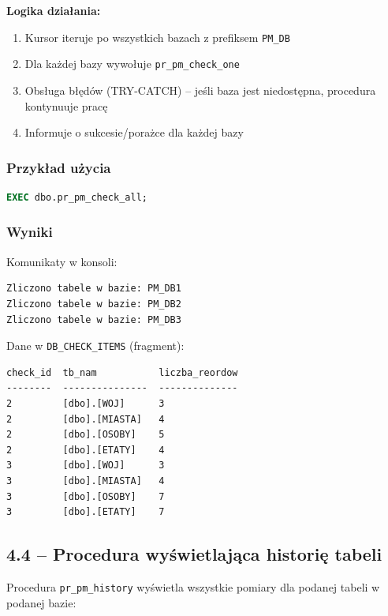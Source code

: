 \documentclass[a4paper,11pt]{article}
\begin{document}
	\textbf{Logika działania:}
	\begin{enumerate}
		\item Kursor iteruje po wszystkich bazach z prefiksem \texttt{PM\_DB}
		\item Dla każdej bazy wywołuje \texttt{pr\_pm\_check\_one}
		\item Obsługa błędów (TRY-CATCH) -- jeśli baza jest niedostępna, procedura kontynuuje pracę
		\item Informuje o sukcesie/porażce dla każdej bazy
	\end{enumerate}
	
	\subsubsection{Przykład użycia}
	
	\begin{lstlisting}[language=SQL]
EXEC dbo.pr_pm_check_all;
	\end{lstlisting}
	
	\subsubsection{Wyniki}
	
	Komunikaty w konsoli:
	\begin{lstlisting}
Zliczono tabele w bazie: PM_DB1
Zliczono tabele w bazie: PM_DB2
Zliczono tabele w bazie: PM_DB3
	\end{lstlisting}
	
	Dane w \texttt{DB\_CHECK\_ITEMS} (fragment):
	\begin{lstlisting}
check_id  tb_nam           liczba_reordow
--------  ---------------  --------------
2         [dbo].[WOJ]      3
2         [dbo].[MIASTA]   4
2         [dbo].[OSOBY]    5
2         [dbo].[ETATY]    4
3         [dbo].[WOJ]      3
3         [dbo].[MIASTA]   4
3         [dbo].[OSOBY]    7
3         [dbo].[ETATY]    7
	\end{lstlisting}
	
	\subsection{4.4 -- Procedura wyświetlająca historię tabeli}
	
	Procedura \texttt{pr\_pm\_history} wyświetla wszystkie pomiary dla podanej tabeli w podanej bazie:
	
\end{document}
